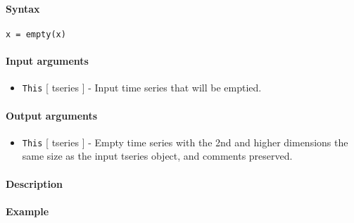 


	\paragraph{Syntax}

\begin{verbatim}
x = empty(x)
\end{verbatim}

\paragraph{Input arguments}

\begin{itemize}
\itemsep1pt\parskip0pt
\item
  \texttt{This} {[} tseries {]} - Input time series that will be
  emptied.
\end{itemize}

\paragraph{Output arguments}

\begin{itemize}
\itemsep1pt\parskip0pt
\item
  \texttt{This} {[} tseries {]} - Empty time series with the 2nd and
  higher dimensions the same size as the input tseries object, and
  comments preserved.
\end{itemize}

\paragraph{Description}

\paragraph{Example}


